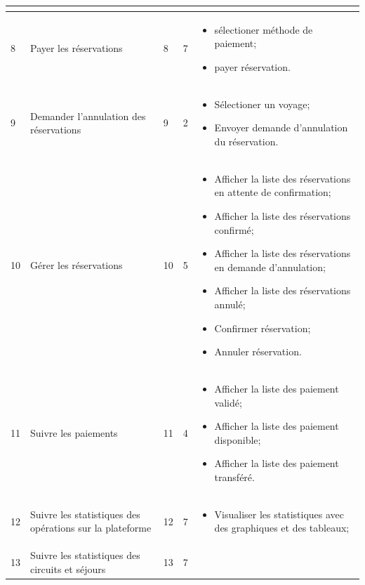 \documentclass[12pt]{report}
\begin{document}
\begin{longtable}{|p{1cm}|p{3cm}|p{2cm}|p{2cm}|p{6cm}|}
\begin{itemize}
						\end{itemize}
						\\
						\hline
						 8&Payer les réservations&8&7&
						\begin{itemize}
							\item sélectioner méthode de paiement;
							\item payer réservation.
						\end{itemize}
						\\
						\hline
						 9&Demander l'annulation des réservations&9&2&
						\begin{itemize}
							\item Sélectioner un voyage;
							\item Envoyer demande d'annulation du réservation.
						\end{itemize}
						\\
						\hline
						 10&Gérer les réservations&10&5&
						\begin{itemize}
							\item Afficher la liste des réservations en attente de confirmation;
							\item Afficher la liste des réservations confirmé;
							\item Afficher la liste des réservations en demande d'annulation;
							\item Afficher la liste des réservations annulé;
							\item Confirmer réservation;
							\item Annuler réservation.
						\end{itemize}
						\\
						\hline
						 11&Suivre les paiements&11&4&
						\begin{itemize}
							\item Afficher la liste des paiement validé;
							\item Afficher la liste des paiement disponible;
							\item Afficher la liste des paiement transféré.
						\end{itemize}
						\\
						\hline
						 12&Suivre les statistiques des opérations sur la plateforme&12&7&
						\begin{itemize}
							\item Visualiser les statistiques avec des graphiques et des tableaux;
						\end{itemize}
						\\
						\hline
						 13&Suivre les statistiques des circuits et séjours&13&7&

\end{longtable}
\end{document}
